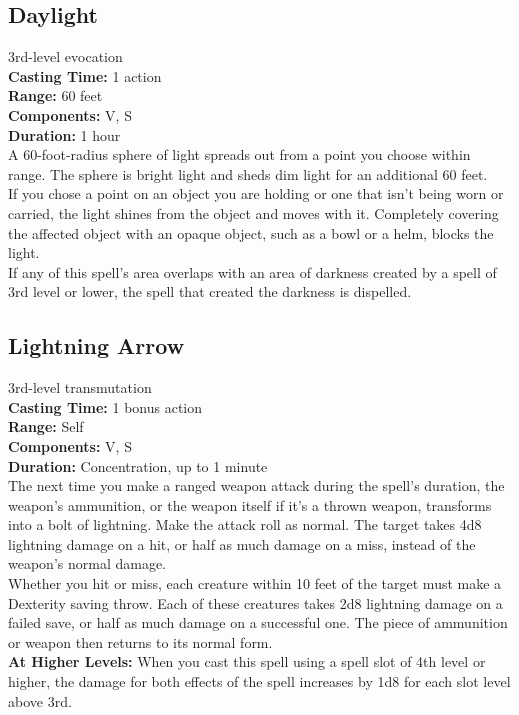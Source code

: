 \documentclass[11pt, A4paper, english]{article}
\begin{document}
		\subsection{Daylight}
3rd-level evocation \\
\textbf{Casting Time:} 1 action \\
\textbf{Range:} 60 feet \\
\textbf{Components:} V, S \\
\textbf{Duration:} 1 hour \\
A 60-foot-radius sphere of light spreads out from a point you choose within range. The sphere is bright light and sheds dim light for an additional 60 feet. \\
If you chose a point on an object you are holding or one that isn’t being worn or carried, the light shines from the object and moves with it. Completely covering the affected object with an opaque object, such as a bowl or a helm, blocks the light. \\
If any of this spell’s area overlaps with an area of darkness created by a spell of 3rd level or lower, the spell that created the darkness is dispelled.

		\subsection{Lightning Arrow}
3rd-level transmutation \\
\textbf{Casting Time:} 1 bonus action \\
\textbf{Range:} Self \\
\textbf{Components:} V, S \\
\textbf{Duration:} Concentration, up to 1 minute \\
The next time you make a ranged weapon attack during the spell’s duration, the weapon’s ammunition, or the weapon itself if it’s a thrown weapon, transforms into a bolt of lightning. Make the attack roll as normal. The target takes 4d8 lightning damage on a hit, or half as much damage on a miss, instead of the weapon’s normal damage. \\
Whether you hit or miss, each creature within 10 feet of the target must make a Dexterity saving throw. Each of these creatures takes 2d8 lightning damage on a failed save, or half as much damage on a successful one. The piece of ammunition or weapon then returns to its normal form. \\
\textbf{At Higher Levels:} When you cast this spell using a spell slot of 4th level or higher, the damage for both effects of the spell increases by 1d8 for each slot level above 3rd.
\end{document}
